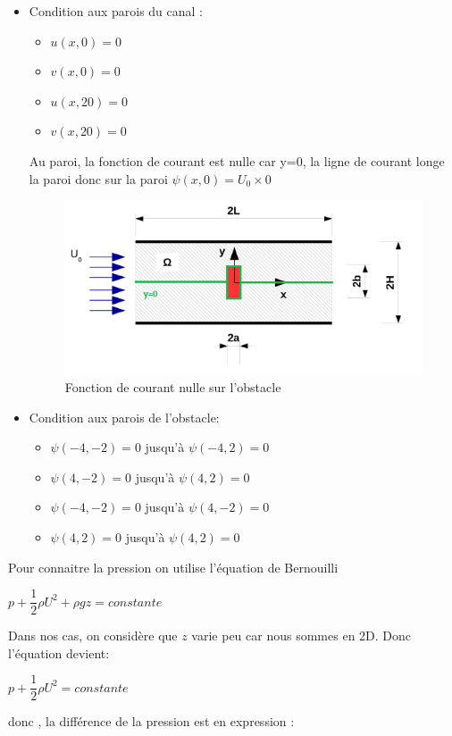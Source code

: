 \documentclass[a4paper,11pt]{report} %
\begin{document}
\begin{center}
\end{center}
\begin{itemize}
   \item Condition aux parois du canal :
	\begin{itemize}
	    \item$u(x,0)=0$
	    \item$v(x,0)=0$
	    \item$u(x,20)=0$
	    \item$v(x,20)=0$
	\end{itemize}
Au paroi, la fonction de courant est nulle car y=0, la ligne de courant longe la paroi donc sur la paroi $\psi(x,0)=U_0\times 0$
\pagebreak
\begin{figure}[!h]
\centering
\hspace*{0mm}\vfill
\begin{center} \includegraphics{vitessenulleparoi.png} \end{center}
\vfill\hspace*{0mm}
\caption{Fonction de courant nulle sur l'obstacle}
\label{Tux}
\end{figure}
   \item Condition aux parois de l'obstacle:
	\begin{itemize}
	    \item$\psi(-4,-2)=0$ jusqu'à $\psi(-4,2)=0$
	    \item$\psi(4,-2)=0$ jusqu'à $\psi(4,2)=0$
	    \item$\psi(-4,-2)=0$ jusqu'à $\psi(4,-2)=0$
	    \item$\psi(4,2)=0$ jusqu'à $\psi(4,2)=0$
	\end{itemize}
\end{itemize}
Pour connaitre la pression on utilise l'équation de Bernouilli
\begin{center}
$p+\dfrac{1}{2}\rho U^2+\rho g z=constante$
\end{center}
Dans nos cas, on considère que $z$ varie peu car nous sommes en 2D. Donc l'équation devient:
\begin{center}
$p+\dfrac{1}{2}\rho U^2=constante$
\end{center} 
donc , la différence de la pression est en expression :
\end{document}
